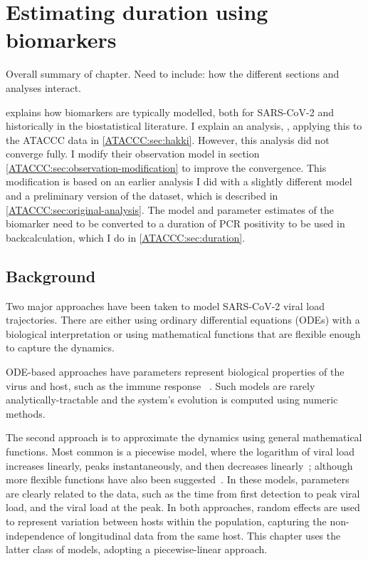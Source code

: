 \documentclass[thesis.tex]{subfiles}
\begin{document}
\ifSubfilesClassLoaded{
  \setcounter{chapter}{4}
}

\chapter{Estimating duration using biomarkers} \label{ATACCC}

Overall summary of chapter.
Need to include: how the different sections and analyses interact.

 explains how biomarkers are typically modelled, both for SARS-CoV-2 and historically in the biostatistical literature.
I explain an analysis, \textcite{hakkiOnset}, applying this to the ATACCC data in \cref{ATACCC:sec:hakki}.
However, this analysis did not converge fully.
I modify their observation model in section \cref{ATACCC:sec:observation-modification} to improve the convergence.
This modification is based on an earlier analysis I did with a slightly different model and a preliminary version of the dataset, which is described in \cref{ATACCC:sec:original-analysis}.
The model and parameter estimates of the biomarker need to be converted to a duration of PCR positivity to be used in backcalculation, which I do in \cref{ATACCC:sec:duration}.

\section{Background}

Two major approaches have been taken to model SARS-CoV-2 viral load trajectories.
There are either using ordinary differential equations (ODEs) with a biological interpretation or using mathematical functions that are flexible enough to capture the dynamics.

ODE-based approaches have parameters represent biological properties of the virus and host, such as the immune response ~\autocites[e.g.:][]{ejimaEstimation,keVivo,kimQuantitative,goncalvesTiming,perelsonMechanistic}.
Such models are rarely analytically-tractable and the system's evolution is computed using numeric methods.

The second approach is to approximate the dynamics using general mathematical functions.
Most common is a piecewise model, where the logarithm of viral load increases linearly, peaks instantaneously, and then decreases linearly~\autocites{clearyUsing,kisslerViral,larremoreTest}; although more flexible functions have also been suggested~\autocites{quiltyQuarantine}.
In these models, parameters are clearly related to the data, such as the time from first detection to peak viral load, and the viral load at the peak.
In both approaches, random effects are used to represent variation between hosts within the population, capturing the non-independence of longitudinal data from the same host.
This chapter uses the latter class of models, adopting a piecewise-linear approach.
\end{document}
